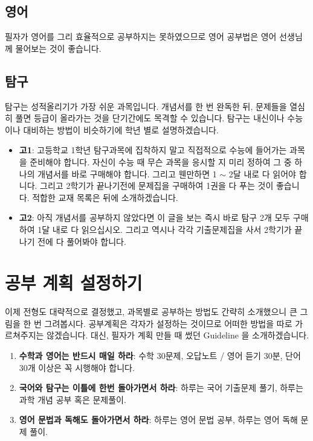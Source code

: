 \documentclass[final]{IEEEphot}
\begin{document}
\subsection{영어}

\hspace{0.3cm} 필자가 영어를 그리 효율적으로 공부하지는 못하였으므로 영어 공부법은 영어 선생님께 물어보는 것이 좋습니다.

\subsection{탐구}

\hspace{0.3cm} 탐구는 성적올리기가 가장 쉬운 과목입니다. 개념서를 한 번 완독한 뒤, 문제들을 열심히 풀면 등급이 올라가는 것을 단기간에도 목격할 수 있습니다.
탐구는 내신이나 수능이나 대비하는 방법이 비슷하기에 학년 별로 설명하겠습니다.

\begin{itemize}
 \item \textbf{고1}: 고등학교 1학년 탐구과목에 집착하지 말고 직접적으로 수능에 들어가는 과목을 준비해야 합니다. 자신이 수능 때 무슨 과목을 응시할 지 미리 정하여 그 중 하나의 개념서를 바로 구매해야 합니다.
 그리고 웬만하면 1 $\sim$ 2달 내로 다 읽어야 합니다. 그리고 2학기가 끝나기전에 문제집을 구매하여 1권을 다 푸는 것이 좋습니다. 적합한 교재 목록은 뒤에 소개하겠습니다.\vspace{0.1cm}
 \item \textbf{고2}: 아직 개념서를 공부하지 않았다면 이 글을 보는 즉시 바로 탐구 2개 모두 구매하여 1달 내로 다 읽으십시오. 그리고 역시나 각각 기출문제집을 사서 2학기가 끝나기 전에 다 풀어봐야 합니다.
\end{itemize}

\pagebreak

\section{공부 계획 설정하기}

\hspace{0.3cm} 이제 전형도 대략적으로 결정했고, 과목별로 공부하는 방법도 간략히 소개했으니 큰 그림을 한 번 그려봅시다. 공부계획은 각자가 설정하는 것이므로 어떠한 방법을 따로 가르쳐주지는 않겠습니다.
대신, 필자가 계획 만들 때 썼던 Guideline 을 소개하겠습니다.

\begin{enumerate}
 \item \textbf{수학과 영어는 반드시 매일 하라}: 수학 30문제, 오답노트 / 영어 듣기 30분, 단어 30개 이상은 꼭 시행해야 합니다.
 \item \textbf{국어와 탐구는 이틀에 한번 돌아가면서 하라}: 하루는 국어 기출문제 풀기, 하루는 과학 개념 공부 혹은 문제풀이.
 \item \textbf{영어 문법과 독해도 돌아가면서 하라}: 하루는 영어 문법 공부, 하루는 영어 독해 문제 풀이.
\end{enumerate}
\end{document}
